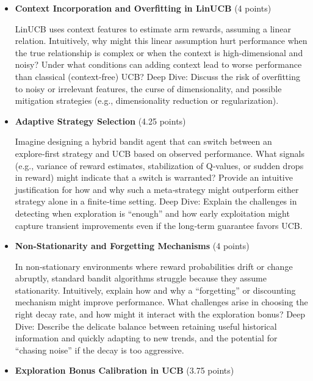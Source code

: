 \documentclass[12pt]{article}
\begin{document}
{{{\begin{itemize}[noitemsep]
    \newpage
    
    \item \textbf{Context Incorporation and Overfitting in LinUCB} (4 points)

    \vspace{0.25cm}
    LinUCB uses context features to estimate arm rewards, assuming a linear relation. Intuitively, why might this linear assumption hurt performance when the true relationship is complex or when the context is high‑dimensional and noisy? Under what conditions can adding context lead to worse performance than classical (context‑free) UCB?
    Deep Dive:
    Discuss the risk of overfitting to noisy or irrelevant features, the curse of dimensionality, and possible mitigation strategies (e.g., dimensionality reduction or regularization).
    \vspace{0.5cm}
    \item \textbf{Adaptive Strategy Selection} (4.25 points)

    \vspace{0.25cm}
    Imagine designing a hybrid bandit agent that can switch between an explore‑first strategy and UCB based on observed performance. What signals (e.g., variance of reward estimates, stabilization of Q‑values, or sudden drops in reward) might indicate that a switch is warranted? Provide an intuitive justification for how and why such a meta‑strategy might outperform either strategy alone in a finite‑time setting.
    Deep Dive:
    Explain the challenges in detecting when exploration is “enough” and how early exploitation might capture transient improvements even if the long‑term guarantee favors UCB.
    \vspace{0.5cm}
    \item \textbf{Non-Stationarity and Forgetting Mechanisms} (4 points)

    \vspace{0.25cm}
    In non‑stationary environments where reward probabilities drift or change abruptly, standard bandit algorithms struggle because they assume stationarity. Intuitively, explain how and why a “forgetting” or discounting mechanism might improve performance. What challenges arise in choosing the right decay rate, and how might it interact with the exploration bonus?
    Deep Dive:
    Describe the delicate balance between retaining useful historical information and quickly adapting to new trends, and the potential for “chasing noise” if the decay is too aggressive.
    \vspace{0.5cm}
    \item \textbf{Exploration Bonus Calibration in UCB} (3.75 points)


\end{itemize}}}}
\end{document}
